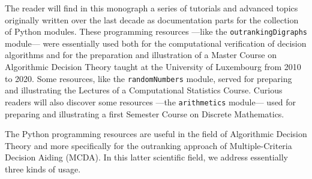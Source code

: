 %
%

\preface






The reader will find in this monograph a series of tutorials and advanced topics originally written over the last decade as documentation parts for the \Digraph collection of Python modules. These programming resources ---like the \texttt{outrankingDigraphs} module--- were essentially used both for the computational verification of decision algorithms and for the preparation and illustration of a Master Course on  Algorithmic Decision Theory taught at the University of Luxembourg from 2010 to 2020. Some resources, like the \texttt{randomNumbers} module, served for preparing and illustrating the Lectures of a Computational Statistics Course. Curious readers will also discover some resources ---the \texttt{arithmetics} module--- used for preparing and illustrating a first Semester Course on Discrete Mathematics.


The \Digraph Python programming resources are useful in the field of Algorithmic Decision Theory and more specifically for the outranking approach of Multiple-Criteria Decision Aiding (MCDA). In this latter scientific field, we address essentially three kinds of usage.

